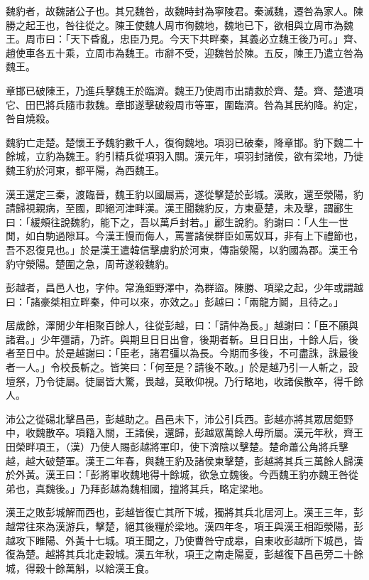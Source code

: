 
\begin{pinyinscope}
魏豹者，故魏諸公子也。其兄魏咎，故魏時封為寧陵君。秦滅魏，遷咎為家人。陳勝之起王也，咎往從之。陳王使魏人周市徇魏地，魏地已下，欲相與立周市為魏王。周市曰：「天下昏亂，忠臣乃見。今天下共畔秦，其義必立魏王後乃可。」齊、趙使車各五十乘，立周市為魏王。市辭不受，迎魏咎於陳。五反，陳王乃遣立咎為魏王。

章邯已破陳王，乃進兵擊魏王於臨濟。魏王乃使周市出請救於齊、楚。齊、楚遣項它、田巴將兵隨市救魏。章邯遂擊破殺周市等軍，圍臨濟。咎為其民約降。約定，咎自燒殺。

魏豹亡走楚。楚懷王予魏豹數千人，復徇魏地。項羽已破秦，降章邯。豹下魏二十餘城，立豹為魏王。豹引精兵從項羽入關。漢元年，項羽封諸侯，欲有梁地，乃徙魏王豹於河東，都平陽，為西魏王。

漢王還定三秦，渡臨晉，魏王豹以國屬焉，遂從擊楚於彭城。漢敗，還至滎陽，豹請歸視親病，至國，即絕河津畔漢。漢王聞魏豹反，方東憂楚，未及擊，謂酈生曰：「緩頰往說魏豹，能下之，吾以萬戶封若。」酈生說豹。豹謝曰：「人生一世閒，如白駒過隙耳。今漢王慢而侮人，罵詈諸侯群臣如罵奴耳，非有上下禮節也，吾不忍復見也。」於是漢王遣韓信擊虜豹於河東，傳詣滎陽，以豹國為郡。漢王令豹守滎陽。楚圍之急，周苛遂殺魏豹。

彭越者，昌邑人也，字仲。常漁鉅野澤中，為群盜。陳勝、項梁之起，少年或謂越曰：「諸豪桀相立畔秦，仲可以來，亦效之。」彭越曰：「兩龍方鬬，且待之。」

居歲餘，澤閒少年相聚百餘人，往從彭越，曰：「請仲為長。」越謝曰：「臣不願與諸君。」少年彊請，乃許。與期旦日日出會，後期者斬。旦日日出，十餘人后，後者至日中。於是越謝曰：「臣老，諸君彊以為長。今期而多後，不可盡誅，誅最後者一人。」令校長斬之。皆笑曰：「何至是？請後不敢。」於是越乃引一人斬之，設壇祭，乃令徒屬。徒屬皆大驚，畏越，莫敢仰視。乃行略地，收諸侯散卒，得千餘人。

沛公之從碭北擊昌邑，彭越助之。昌邑未下，沛公引兵西。彭越亦將其眾居鉅野中，收魏散卒。項籍入關，王諸侯，還歸，彭越眾萬餘人毋所屬。漢元年秋，齊王田榮畔項王，（漢）乃使人賜彭越將軍印，使下濟陰以擊楚。楚命蕭公角將兵擊越，越大破楚軍。漢王二年春，與魏王豹及諸侯東擊楚，彭越將其兵三萬餘人歸漢於外黃。漢王曰：「彭將軍收魏地得十餘城，欲急立魏後。今西魏王豹亦魏王咎從弟也，真魏後。」乃拜彭越為魏相國，擅將其兵，略定梁地。

漢王之敗彭城解而西也，彭越皆復亡其所下城，獨將其兵北居河上。漢王三年，彭越常往來為漢游兵，擊楚，絕其後糧於梁地。漢四年冬，項王與漢王相距滎陽，彭越攻下睢陽、外黃十七城。項王聞之，乃使曹咎守成皋，自東收彭越所下城邑，皆復為楚。越將其兵北走穀城。漢五年秋，項王之南走陽夏，彭越復下昌邑旁二十餘城，得穀十餘萬斛，以給漢王食。


\end{pinyinscope}
